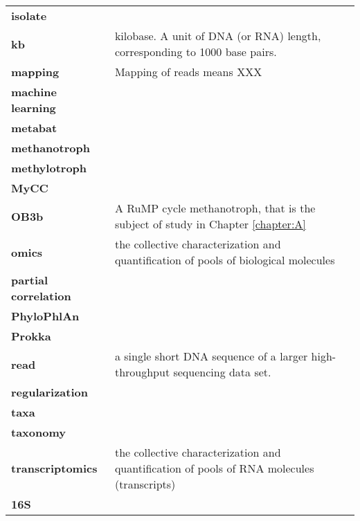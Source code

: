 \begin{singlespace}
\begin{longtable}{ p{}  p{} }
\textbf{isolate} & \\
\textbf{kb} & kilobase. A unit of DNA (or RNA) length, corresponding to 1000 base pairs. \\
\textbf{mapping} & Mapping of reads means XXX \\
\textbf{machine learning} &  \\
\textbf{metabat} &  \\
\textbf{methanotroph} &  \\
\textbf{methylotroph} &  \\
\textbf{MyCC} &  \\
\textbf{OB3b} & A RuMP cycle methanotroph, that is the subject of study in Chapter \ref{chapter:A}  \\
\textbf{omics} & the collective characterization and quantification of pools of biological molecules \\
\textbf{partial correlation} &  \\
\textbf{PhyloPhlAn} &  \\
\textbf{Prokka} &  \\
\textbf{read} & a single short DNA sequence of a larger high-throughput sequencing data set. \\
\textbf{regularization} &  \\
\textbf{taxa} &  \\
\textbf{taxonomy} &  \\
\textbf{transcriptomics} & the collective characterization and quantification of pools of RNA molecules (transcripts) \\
\textbf{16S} &  \\

\end{longtable}
\end{singlespace}
